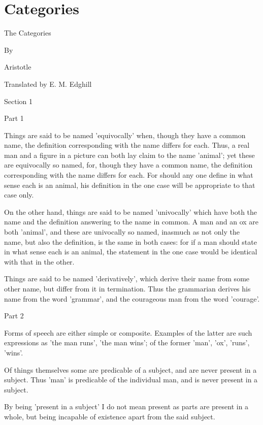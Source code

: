 \chapter{Categories} %
\label{cha:categories}





The Categories


By

Aristotle


Translated by E. M. Edghill



Section 1

Part 1

Things are said to be named 'equivocally' when, though they have a
common name, the definition corresponding with the name differs for
each. Thus, a real man and a figure in a picture can both lay claim to
the name 'animal'; yet these are equivocally so named, for, though they
have a common name, the definition corresponding with the name differs
for each. For should any one define in what sense each is an animal,
his definition in the one case will be appropriate to that case only.

On the other hand, things are said to be named 'univocally' which have
both the name and the definition answering to the name in common. A man
and an ox are both 'animal', and these are univocally so named,
inasmuch as not only the name, but also the definition, is the same in
both cases: for if a man should state in what sense each is an animal,
the statement in the one case would be identical with that in the other.

Things are said to be named 'derivatively', which derive their name
from some other name, but differ from it in termination. Thus the
grammarian derives his name from the word 'grammar', and the courageous
man from the word 'courage'.



Part 2

Forms of speech are either simple or composite. Examples of the latter
are such expressions as 'the man runs', 'the man wins'; of the former
'man', 'ox', 'runs', 'wins'.

Of things themselves some are predicable of a subject, and are never
present in a subject. Thus 'man' is predicable of the individual man,
and is never present in a subject.

By being 'present in a subject' I do not mean present as parts are
present in a whole, but being incapable of existence apart from the
said subject.

